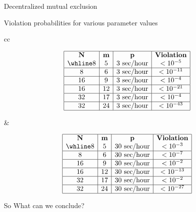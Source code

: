 \begin{frame}{Decentralized mutual exclusion}
  \begin{block}{Violation probabilities for various parameter values}
    \begin{center}
      \small\footnotesize
      \renewcommand{\arraystretch}{1.1}
      \begin{tabular}{cc}
        \begin{minipage}{0.4\textwidth}
          \[
            \begin{array}{|c|c|c|c|}\hline
              \mathbf{N} & \mathbf{m} & \mathbf{p}        & \mbox{\textbf{Violation}} \\ \whline
              8          & 5          & \mbox{3 sec/hour} & < 10^{-5}                 \\ \hline
              8          & 6          & \mbox{3 sec/hour} & < 10^{-11}                \\ \hline
              16         & 9          & \mbox{3 sec/hour} & < 10^{-4}                 \\ \hline
              16         & 12         & \mbox{3 sec/hour} & < 10^{-21}                \\ \hline
              32         & 17         & \mbox{3 sec/hour} & < 10^{-4}                 \\ \hline
              32         & 24         & \mbox{3 sec/hour} & < 10^{-43}                \\ \hline
            \end{array}
          \]
        \end{minipage} &
        \begin{minipage}{0.4\textwidth}
          \[
            \begin{array}{|c|c|c|c|}\hline
              \mathbf{N} & \mathbf{m} & \mathbf{p}         & \mbox{\textbf{Violation}} \\ \whline
              8          & 5          & \mbox{30 sec/hour} & < 10^{-3}                 \\ \hline
              8          & 6          & \mbox{30 sec/hour} & < 10^{-7}                 \\ \hline
              16         & 9          & \mbox{30 sec/hour} & < 10^{-2}                 \\ \hline
              16         & 12         & \mbox{30 sec/hour} & < 10^{-13}                \\ \hline
              32         & 17         & \mbox{30 sec/hour} & < 10^{-2}                 \\ \hline
              32         & 24         & \mbox{30 sec/hour} & < 10^{-27}                \\ \hline
            \end{array}
          \]
        \end{minipage}
      \end{tabular}
    \end{center}
  \end{block}
  \begin{alertblock}{So}
    What can we conclude?
  \end{alertblock}
\end{frame}
